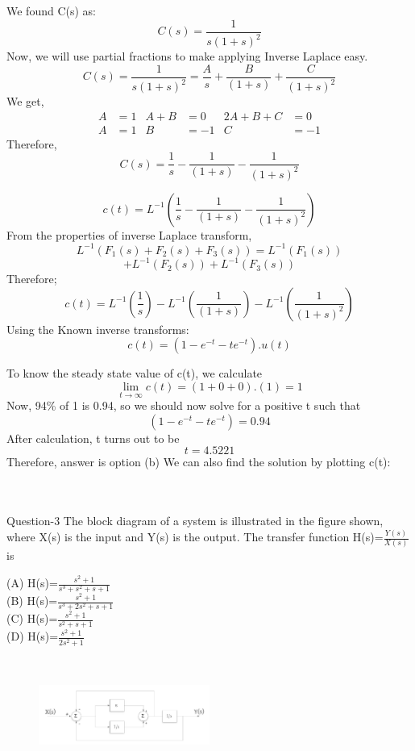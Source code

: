 \documentclass[journal,12pt,twocolumn]{IEEEtran}
\begin{document}
We found C(s) as:
$$C(s) =  \frac{1}{s(1+s)^2}$$
Now, we will use partial fractions to make applying Inverse Laplace easy.
$$C(s) =  \frac{1}{s(1+s)^2} =  \frac{A}{s} + \frac{B}{(1+s)} + \frac{C}{(1+s)^2}$$
We get, 
\begin{align*}
A &= 1 & A+B &=0 & 2A+B+C &= 0 \\
A &=1 & B &=-1 & C &=-1
\end{align*}
Therefore,
$$C(s) = \frac{1}{s} - \frac{1}{(1+s)} - \frac{1}{(1+s)^2}$$

$$c(t) = L^{-1} ( \frac{1}{s} - \frac{1}{(1+s)} - \frac{1}{(1+s)^2}) $$
From the properties of inverse Laplace transform,
$$L^{-1} (F_1(s) + F_2(s) + F_3(s)) = L^{-1}(F_1(s)) $$ 
$$ + L^{-1}(F_2(s)) + L^{-1}(F_3(s))$$
Therefore;
$$c(t) = L^{-1} ( \frac{1}{s}) - L^{-1}(\frac{1}{(1+s)}) - L^{-1}(\frac{1}{(1+s)^2}) $$
Using the Known inverse transforms:
$$c(t) = (1 - e^{-t} - te^{-t}) . u(t)$$

To know the steady state value of c(t), we calculate 
$$\lim_{t\to\infty} c(t) = (1+0+0).(1) = 1$$
Now, 94\% of 1 is 0.94, so we should now solve for a positive t such that
$$(1 - e^{-t} - te^{-t}) = 0.94$$
After calculation, t turns out to be
$$ t = 4.5221$$
Therefore, answer is option (b)
We can also find the solution by plotting c(t):
\\\\\

\begin{frame}{Question-3 }
The block diagram of a system is illustrated in the figure shown, where X(s) is the input and Y(s) is the output. The transfer function H(s)=$\frac{Y(s)}{X(s)}$ is 

(A) H(s)=$\frac{s^2+1}{s^3+s^2+s+1}$ \\
(B) H(s)=$\frac{s^2+1}{s^3+2s^2+s+1}$ \\
(C) H(s)=$\frac{s^2+1}{s^2+s+1}$ \\
(D) H(s)=$\frac{s^2+1}{2s^2+1}$
\end{frame}\\
\begin{figure}[h]
\includegraphics[width=0.5\textwidth]{./figs/pic1.png}
\end{figure}
\end{document}
